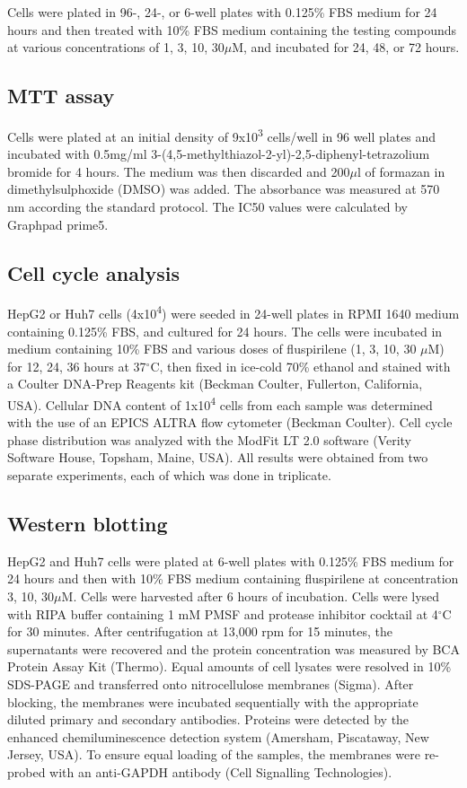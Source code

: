 \documentclass[10pt]{article}
\begin{document}
Cells were plated in 96-, 24-, or 6-well plates with 0.125\% FBS medium for 24 hours and then treated with 10\% FBS medium containing the testing compounds at various concentrations of 1, 3, 10, 30$\mu$M, and incubated for 24, 48, or 72 hours.

\subsection*{MTT assay}

Cells were plated at an initial density of 9x10\textsuperscript{3} cells/well in 96 well plates and incubated with 0.5mg/ml 3-(4,5-methylthiazol-2-yl)-2,5-diphenyl-tetrazolium bromide for 4 hours. The medium was then discarded and 200$\mu$l of formazan in dimethylsulphoxide (DMSO) was added. The absorbance was measured at 570 nm according the standard protocol. The IC50 values were calculated by Graphpad prime5.

\subsection*{Cell cycle analysis}

HepG2 or Huh7 cells (4x10\textsuperscript{4}) were seeded in 24-well plates in RPMI 1640 medium containing 0.125\% FBS, and cultured for 24 hours. The cells were incubated in medium containing 10\% FBS and various doses of fluspirilene (1, 3, 10, 30 $\mu$M) for 12, 24, 36 hours at 37$^\circ$C, then fixed in ice-cold 70\% ethanol and stained with a Coulter DNA-Prep Reagents kit (Beckman Coulter, Fullerton, California, USA). Cellular DNA content of 1x10\textsuperscript{4} cells from each sample was determined with the use of an EPICS ALTRA flow cytometer (Beckman Coulter). Cell cycle phase distribution was analyzed with the ModFit LT 2.0 software (Verity Software House, Topsham, Maine, USA). All results were obtained from two separate experiments, each of which was done in triplicate.

\subsection*{Western blotting}

HepG2 and Huh7 cells were plated at 6-well plates with 0.125\% FBS medium for 24 hours and then with 10\% FBS medium containing fluspirilene at concentration 3, 10, 30$\mu$M. Cells were harvested after 6 hours of incubation. Cells were lysed with RIPA buffer containing 1 mM PMSF and protease inhibitor cocktail at 4$^\circ$C for 30 minutes. After centrifugation at 13,000 rpm for 15 minutes, the supernatants were recovered and the protein concentration was measured by BCA Protein Assay Kit (Thermo). Equal amounts of cell lysates were resolved in 10\% SDS-PAGE and transferred onto nitrocellulose membranes (Sigma). After blocking, the membranes were incubated sequentially with the appropriate diluted primary and secondary antibodies. Proteins were detected by the enhanced chemiluminescence detection system (Amersham, Piscataway, New Jersey, USA). To ensure equal loading of the samples, the membranes were re-probed with an anti-GAPDH antibody (Cell Signalling Technologies).
\end{document}
